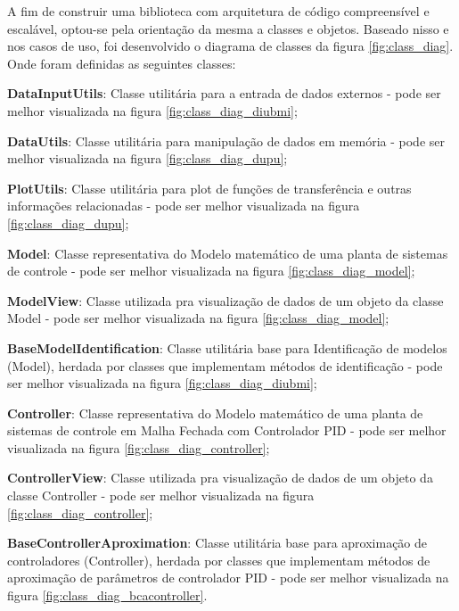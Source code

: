 A fim de construir uma biblioteca com arquitetura de código compreensível e escalável, optou-se pela orientação
da mesma a classes e objetos.
Baseado nisso e nos casos de uso, foi desenvolvido o diagrama de classes da figura \ref{fig:class_diag}.
Onde foram definidas as seguintes classes:
\begin{alineas}
    \item \textbf{DataInputUtils}: Classe utilitária para a entrada de dados externos - pode ser melhor visualizada na figura \ref{fig:class_diag_diubmi};
    \item \textbf{DataUtils}: Classe utilitária para manipulação de dados em memória - pode ser melhor visualizada na figura \ref{fig:class_diag_dupu};
    \item \textbf{PlotUtils}: Classe utilitária para plot de funções de transferência e outras informações relacionadas - pode ser melhor visualizada na figura \ref{fig:class_diag_dupu};
    \item \textbf{Model}: Classe representativa do Modelo matemático de uma planta de sistemas de controle - pode ser melhor visualizada na figura \ref{fig:class_diag_model};
    \item \textbf{ModelView}: Classe utilizada pra visualização de dados de um objeto da classe Model - pode ser melhor visualizada na figura \ref{fig:class_diag_model};
    \item \textbf{BaseModelIdentification}: Classe utilitária base para Identificação de modelos (Model), herdada por classes que implementam métodos de identificação - pode ser melhor visualizada na figura \ref{fig:class_diag_diubmi};
    \item \textbf{Controller}: Classe representativa do Modelo matemático de uma planta de sistemas de controle em Malha Fechada com Controlador PID - pode ser melhor visualizada na figura \ref{fig:class_diag_controller};
    \item \textbf{ControllerView}: Classe utilizada pra visualização de dados de um objeto da classe Controller - pode ser melhor visualizada na figura \ref{fig:class_diag_controller};
    \item \textbf{BaseControllerAproximation}: Classe utilitária base para aproximação de controladores (Controller), herdada por classes que implementam métodos de aproximação de parâmetros de controlador PID - pode ser melhor visualizada na figura \ref{fig:class_diag_bcacontroller}.
\end{alineas}

